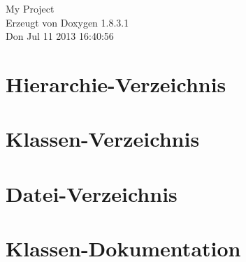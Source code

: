 \documentclass{book}
\begin{document}
\hypersetup{pageanchor=false,citecolor=blue}
\begin{titlepage}
\vspace*{7cm}
\begin{center}
{\Large My Project }\\
\vspace*{1cm}
{\large Erzeugt von Doxygen 1.8.3.1}\\
\vspace*{0.5cm}
{\small Don Jul 11 2013 16:40:56}\\
\end{center}
\end{titlepage}
\clearemptydoublepage
{}
\tableofcontents
\clearemptydoublepage
{}
\hypersetup{pageanchor=true,citecolor=blue}
\chapter{Hierarchie-\/\-Verzeichnis}

\chapter{Klassen-\/\-Verzeichnis}

\chapter{Datei-\/\-Verzeichnis}

\chapter{Klassen-\/\-Dokumentation}
































\end{document}
